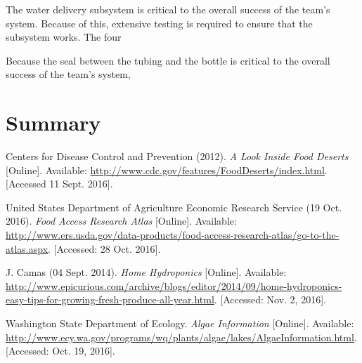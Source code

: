 \documentclass[12pt]{article}
\begin{document}
The water delivery subsystem is critical to the overall success of the team's system. Because of
this, extensive testing is required to ensure that the subsystem works. The four 

Because the seal between the tubing and the bottle is critical to the overall success of the team's
system, 



\section{Summary}


\pagebreak

\begin{thebibliography}{9}
    Centers for Disease Control and Prevention (2012).
    \textit{A Look Inside Food Deserts} [Online].
    Available: \url{http://www.cdc.gov/features/FoodDeserts/index.html}.
    [Accessed 11 Sept. 2016].

    United States Department of Agriculture Economic Research Service (19 Oct. 2016).
    \textit{Food Access Research Atlas} [Online].
    Available:
    \url{http://www.ers.usda.gov/data-products/food-access-research-atlas/go-to-the-atlas.aspx}.
    [Accessed: 28 Oct. 2016].

    J. Camas (04 Sept. 2014).
    \textit{Home Hydroponics} [Online].
    Available:
    \url{http://www.epicurious.com/archive/blogs/editor/2014/09/home-hydroponics-easy-tips-for-growing-fresh-produce-all-year.html}.
    [Accessed: Nov. 2, 2016].

    Washington State Department of Ecology.
    \textit{Algae Information} [Online].
    Available: \url{http://www.ecy.wa.gov/programs/wq/plants/algae/lakes/AlgaeInformation.html}.
    [Accessed: Oct. 19, 2016].

\end{thebibliography}
\end{document}
